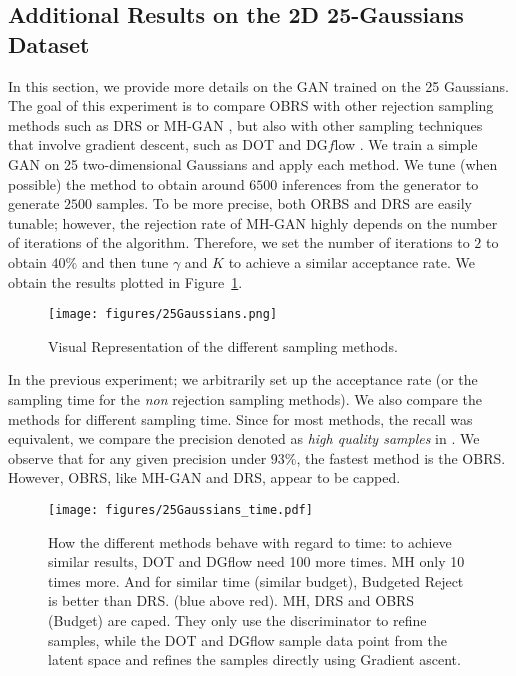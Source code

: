 \documentclass[twoside]{article}
\begin{document}
 \subsection{Additional Results on the 2D 25-Gaussians Dataset}  \label{app:subsec:xp2D}
In this section, we provide more details on the GAN trained on the 25 Gaussians. The goal of this experiment is to compare OBRS with other rejection sampling methods such as DRS \citep{azadi_discriminator_2019} or MH-GAN \citep{turner_metropolis-hastings_2019}, but also with other sampling techniques that involve gradient descent, such as DOT \citep{tanaka_discriminator_2019} and DG$f$low \citep{ansari_refining_2021}. We train a simple GAN on 25 two-dimensional Gaussians and apply each method. We tune (when possible) the method to obtain around $6500$ inferences from the generator to generate $2500$ samples. To be more precise, both ORBS and DRS are easily tunable; however, the rejection rate of MH-GAN highly depends on the number of iterations of the algorithm. Therefore, we set the number of iterations to $2$ to obtain $40\%$ and then tune $\gamma$ and $K$ to achieve a similar acceptance rate.  We obtain the results plotted in Figure~\ref{app:fig:2Dviz}.
\begin{figure}[H]
     \centering
     \texttt{[image: figures/25Gaussians.png]}
     \caption{Visual Representation of the different sampling methods.}
     \label{app:fig:2Dviz}
 \end{figure}

In the previous experiment; we arbitrarily set up the acceptance rate (or the sampling time for the \emph{non} rejection sampling methods). We also compare the methods for different sampling time. Since for most methods, the recall was equivalent, we compare the precision denoted as \emph{high quality samples} in \cite{dumoulin_adversarially_2017}. We observe that for any given precision under $93\%$, the fastest method is the OBRS. However, OBRS,  like MH-GAN and DRS, appear to be capped.   
\begin{figure}[H]
    \centering
    \texttt{[image: figures/25Gaussians\_time.pdf]}
    \caption{How the different methods behave with regard to time: to achieve similar results, DOT and DGflow need 100 more times. MH only 10 times more. And for similar time (similar budget), Budgeted Reject is better than DRS. (blue above red). MH, DRS and OBRS (Budget) are caped. They only use the discriminator to refine samples, while the DOT and DGflow sample data point from the latent space and refines the samples directly using Gradient ascent.}
    \label{fig:enter-label}
\end{figure}
\end{document}
